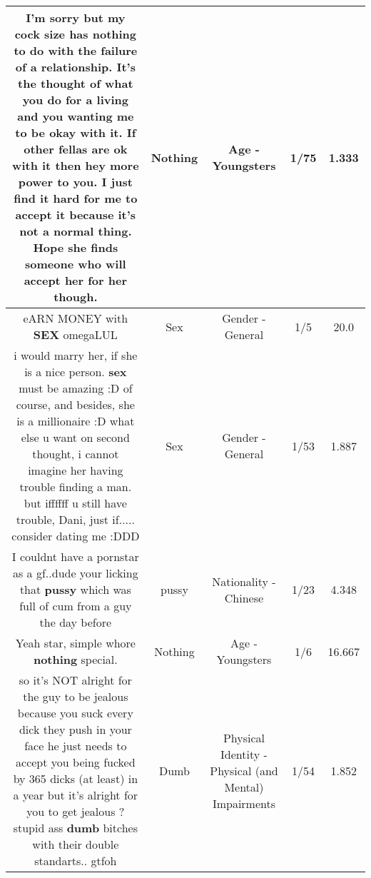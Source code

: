 \documentclass[11pt]{article}
\newlength\mylength
\begin{document}
\begin{center}
\begin{longtable}{|C{.65\mylength}|C{.30\mylength}|C{.12\mylength}|C{.12\mylength}|C{.12\mylength}|}
  \small I'm sorry but my cock size has \textbf{nothing} to do with the failure of a relationship. It's the thought of what you do for a living and you wanting me to be okay with it. If other fellas are ok with it then hey more power to you. I just find it hard for me to accept it because it's not a normal thing. Hope she finds someone who will accept her for her though.\normalsize   & Nothing & Age - Youngsters & 1/75 & 1.333 \\  \hline
  \small eARN MONEY with \textbf{SEX} omegaLUL\normalsize   & Sex & Gender - General & 1/5 & 20.0 \\  \hline
  \small i would marry her, if she is a nice person. \textbf{sex} must be amazing :D of course, and besides, she is a millionaire :D what else u want   on second thought, i cannot imagine her having trouble finding a man. but iffffff u still have trouble, Dani, just if..... consider dating me :DDD\normalsize   & Sex & Gender - General & 1/53 & 1.887 \\  \hline
  \small I couldnt have a pornstar as a gf..dude your licking that \textbf{pussy} which was full of cum from a guy the day before\normalsize   & pussy & Nationality - Chinese & 1/23 & 4.348 \\  \hline
  \small Yeah star, simple whore \textbf{nothing} special.\normalsize   & Nothing & Age - Youngsters & 1/6 & 16.667 \\  \hline
  \small so it's NOT alright for the guy to be jealous because you suck every dick they push in your face he just needs to accept you being fucked by 365 dicks (at least) in a year but it's alright for you to get jealous ? stupid ass \textbf{dumb} bitches with their double standarts.. gtfoh\normalsize   & Dumb & Physical Identity - Physical (and Mental) Impairments & 1/54 & 1.852 \\  \hline

\end{longtable}
\end{center}
\end{document}
